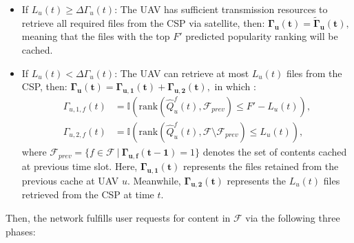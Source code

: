 \documentclass[journal]{IEEEtran}
\begin{document}
\begin{itemize}
    \item {If \( L_u(t) \geq \Delta \Gamma_{u}(t) \)}: The UAV has sufficient transmission resources to retrieve all required files from the CSP via satellite, then:
    \(
        \boldsymbol{\Gamma_{u}(t)} = \boldsymbol{\tilde{\Gamma}_u(t)},
    \)
    meaning that the files with the top \( F' \) predicted popularity ranking will be cached.

    \item {If \( L_u(t) < \Delta\Gamma_{u}(t) \)}: The UAV can retrieve at most \( L_u(t) \) files from the CSP, then:
\(
    \boldsymbol{\Gamma_{u}(t)} = \boldsymbol{\Gamma_{u,1}(t)} + \boldsymbol{\Gamma_{u,2}(t)},
\)
in which :
\begin{align*}
    \Gamma_{u,1,f}(t) &= \mathbb{I} \left( \text{rank} \left(\hat{Q}^{f}_{u}(t), \mathcal{F}_{{prev}} \right) \leq F' - L_u(t) \right), \\
    \Gamma_{u,2,f}(t) &= \mathbb{I} \left( \text{rank} \left(\hat{Q}^{f}_{u}(t), \mathcal{F} \setminus \mathcal{F}_{{prev}} \right) \leq L_u(t) \right),
\end{align*} where $\mathcal{F}_{{prev}} = \{ f \in \mathcal{F} \ | \ \boldsymbol{\Gamma_{u,f}(t-1)} = 1\}$ denotes the set of contents cached at previous time slot. Here, \( \boldsymbol{\Gamma_{u,1}(t)} \) represents the files retained from the previous cache at UAV \( u \). Meanwhile, \( \boldsymbol{\Gamma_{u,2}(t)} \) represents the \( L_u(t) \) files retrieved from the CSP at time \( t \).
\end{itemize}
Then, the network fulfills user requests for content in \( \mathcal{F} \) via the following three phases:
\end{document}
